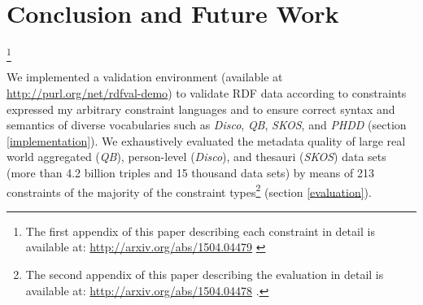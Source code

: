 \documentclass{llncs}
\newcommand{\tb}[1]{\todo[size=\small, color=green!40]{\textbf{Thomas:} #1}}
\begin{document}
{{\section{Conclusion and Future Work}

\tb{ToDO}


\footnote{The first appendix of this paper describing each constraint in detail is available at: \url{http://arxiv.org/abs/1504.04479} \cite{BoschZapilkoWackerowEckert2015}}

We implemented a validation environment (available at \url{http://purl.org/net/rdfval-demo}) to validate RDF data according to constraints expressed my arbitrary constraint languages and to ensure correct syntax and semantics of diverse vocabularies such as \emph{Disco}, \emph{QB}, \emph{SKOS}, and \emph{PHDD} (section \ref{implementation}).
We exhaustively evaluated the metadata quality of large real world aggregated (\emph{QB}), person-level (\emph{Disco}), and thesauri (\emph{SKOS}) data sets (more than 4.2 billion triples and 15 thousand data sets) by means of 213  constraints of the majority of the constraint types\footnote{The second appendix of this paper describing the evaluation in detail is available at: \url{http://arxiv.org/abs/1504.04478} \cite{BoschZapilkoWackerowEckert2015-2}.} (section \ref{evaluation}).

}}
\end{document}
